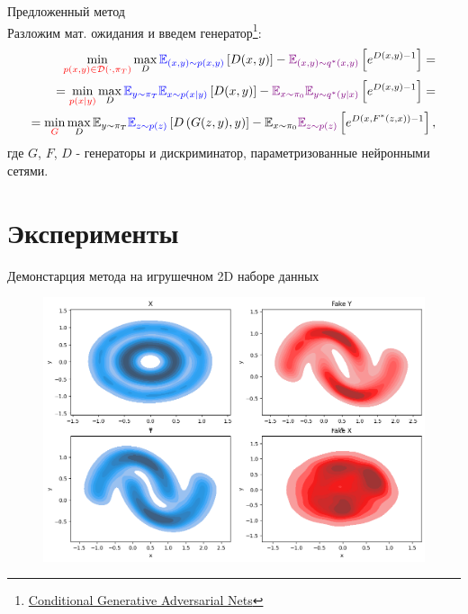\documentclass[10pt,pdf,hyperref={unicode}]{beamer}
\begin{document}
\begin{frame}{Предложенный метод}
    ~\\[-1mm]
    Разложим мат. ожидания и введем генератор\footnote{\href{https://arxiv.org/abs/1411.1784}{Conditional Generative Adversarial Nets}}:
    \begin{equation*}
        \begin{split}
             \min_{\textcolor{red}{p(x,y)\in\mathcal{D}(\cdot, \pi_T)}}\max_{D}\textcolor{blue}{\mathbb{E}_{(x,y)\sim p(x,y)}}\left[D(x,y)\right] - \textcolor{violet}{\mathbb{E}_{(x,y)\sim q^*(x,y)}}\left[e^{D(x,y) - 1}\right] = \\ = \min_{\textcolor{red}{p(x|y)}}\max_{D}\textcolor{blue}{\mathbb{E}_{y \sim \pi_T}\mathbb{E}_{x\sim p(x|y)}}\left[D(x,y)\right] - \textcolor{violet}{\mathbb{E}_{x\sim\pi_0}\mathbb{E}_{y\sim q^*(y|x)}}\left[e^{D(x,y) - 1}\right] = \\ = \min_{\textcolor{red}{G}}\max_{D}\mathbb{E}_{y \sim \pi_T}\textcolor{blue}{\mathbb{E}_{z\sim p(z)}}\left[D\left(G(z,y),y\right)\right] - \mathbb{E}_{x\sim\pi_0}\textcolor{violet}{\mathbb{E}_{z\sim p(z)}}\left[e^{D(x,F^*(z,x)) - 1}\right],
        \end{split}
    \end{equation*}
    где $G$, $F$, $D$ - генераторы и дискриминатор, параметризованные нейронными сетями.
\end{frame}



\section{Эксперименты}
\begin{frame}{Демонстарция метода на игрушечном 2D наборе данных }
    \justifying
    \begin{figure}
        \centering
        \includegraphics[width=0.7\linewidth]{slides//4th//figures/2d_toy.png}
    \end{figure}
\end{frame}
\end{document}
